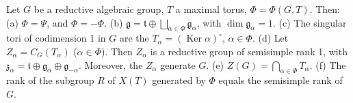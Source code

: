 Let $G$ be a reductive algebraic group, $T$ a maximal torus, $\Phi = \Phi(G, T)$. Then:
(a) $\Phi = \Psi$, and $\Phi = -\Phi$.
(b) $\mathfrak{g} = \mathfrak{t} \oplus \bigsqcup_{\alpha \in \Phi} \mathfrak{g}_{\alpha}$, with $\dim \mathfrak{g}_{\alpha} = 1$.
(c) The singular tori of codimension 1 in $G$ are the $T_{\alpha} = (\operatorname{Ker} \alpha)^{\circ}$, $\alpha \in \Phi$.
(d) Let $Z_{\alpha} = C_G(T_{\alpha})$ ($\alpha \in \Phi$). Then $Z_{\alpha}$ is a reductive group of semisimple rank 1, with $\mathfrak{z}_{\alpha} = \mathfrak{t} \oplus \mathfrak{g}_{\alpha} \oplus \mathfrak{g}_{-\alpha}$. Moreover, the $Z_{\alpha}$ generate $G$.
(e) $Z(G) = \bigcap_{\alpha \in \Phi} T_{\alpha}$.
(f) The rank of the subgroup $R$ of $X(T)$ generated by $\Phi$ equals the semisimple rank of $G$.
